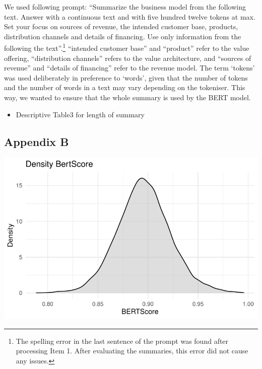\documentclass[
]{article}
\providecommand{\tightlist}{%
  \setlength{\itemsep}{0pt}\setlength{\parskip}{0pt}}\usepackage{longtable,booktabs,array}
\begin{document}
We used following prompt: ``Summarize the business model from the
following text. Answer with a continuous text and with five hundred
twelve tokens at max. Set your focus on sources of revenue, the intended
customer base, products, distribution channels and details of financing.
Use only information from the following the text''.\footnote{The
  spelling error in the last sentence of the prompt was found after
  processing Item 1. After evaluating the summaries, this error did not
  cause any issues.} ``intended customer base'' and ``product'' refer to
the value offering, ``distribution channels'' refers to the value
architecture, and ``sources of revenue'' and ``details of financing''
refer to the revenue model. The term `tokens' was used deliberately in
preference to `words', given that the number of tokens and the number of
words in a text may vary depending on the tokeniser. This way, we wanted
to ensure that the whole summary is used by the BERT model.

\begin{itemize}
\tightlist
\item
  Descriptive Table3 for length of summary
\end{itemize}

\subsection{Appendix B}\label{appendix-b}

\includegraphics{ProjectEcoDataScience_files/figure-pdf/unnamed-chunk-6-1.pdf}

\begin{figure}%
\end{figure}%
\end{document}

